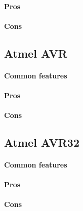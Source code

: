 \documentclass[a4paper,10pt]{article}
\begin{document}
\begin{multicols}{2}
\paragraph{Pros}
\TODO


\paragraph{Cons}
\TODO


\subsection{Atmel AVR}

\TODO


\paragraph{Common features}
\TODO


\paragraph{Pros}
\TODO


\paragraph{Cons}
\TODO


\subsection{Atmel AVR32}

\TODO


\paragraph{Common features}
\TODO


\paragraph{Pros}
\TODO


\paragraph{Cons}
\TODO



\end{multicols}
\end{document}
